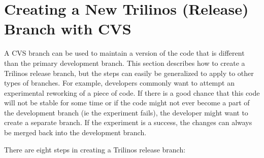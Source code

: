 \documentclass[12pt,relax]{TrilinosDevGuide}
\begin{document}
\section{Creating a New Trilinos (Release) Branch with CVS}
\label{Section:Branching}

A CVS branch can be used to maintain a version of the 
code that is different than the primary development branch.  
This section describes how to create a Trilinos release branch, but the 
steps can easily be generalized to apply to other types of branches.  For 
example, developers commonly want to attempt an experimental reworking of 
a piece of code.  If there is a good chance that this code will not be stable 
for some time or if the code might not ever become a part of the development 
branch (ie the experiment fails), the developer might want to create a 
separate branch.  If the experiment is a success, the changes can always be 
merged back into the development branch.



There are eight steps in creating a Trilinos release branch:
\end{document}
